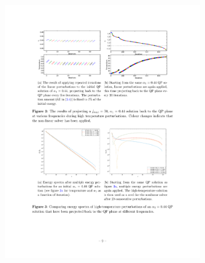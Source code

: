 \documentclass[mathserif,10pt]{beamer}
\begin{document}
{{  \vspace{-0.15in}
  \begin{columns}
  \begin{figure}
  \centering
  \hspace{0.1in}
  \includegraphics[scale=0.85]{reop5}
  \end{figure}
  \begin{figure}
  \centering
  \hspace{-0.1in}
   \vspace{-0.2in}

\end{figure}
\end{columns}}}
\end{document}

